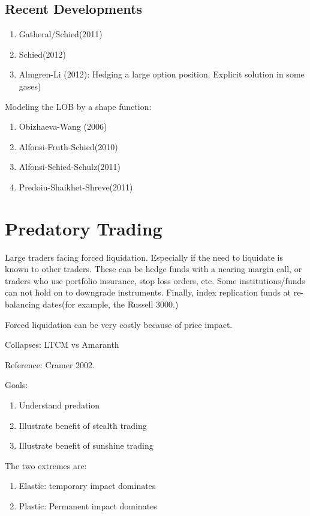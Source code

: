 \section{Recent Developments}
\begin{enumerate}
	\item Gatheral/Schied(2011)
	\item Schied(2012)
	\item Almgren-Li (2012): Hedging a large option position. Explicit solution in some gases)
\end{enumerate}
Modeling the LOB by a shape function:
\begin{enumerate}
	\item Obizhaeva-Wang (2006)
	\item Alfonsi-Fruth-Schied(2010)
	\item Alfonsi-Schied-Schulz(2011)
	\item Predoiu-Shaikhet-Shreve(2011)
\end{enumerate}

\chapter{Predatory Trading}
Large traders facing forced liquidation.
Especially if the need to liquidate is known to other traders. These can be hedge funds with a nearing margin call, or traders who use portfolio insurance, stop loss orders, etc. Some institutions/funds can not hold on to downgrade instruments. Finally, index replication funds at re-balancing dates(for example, the Russell 3000.)

Forced liquidation can be very costly because of price impact.

Collapses: LTCM vs Amaranth

Reference: Cramer 2002.

Goals:
\begin{enumerate}
	\item Understand predation
	\item Illustrate benefit of stealth trading
	\item Illustrate benefit of sunshine trading
\end{enumerate}

The two extremes are:
\begin{enumerate}
	\item Elastic: temporary impact dominates
	\item Plastic: Permanent impact dominates
\end{enumerate}












